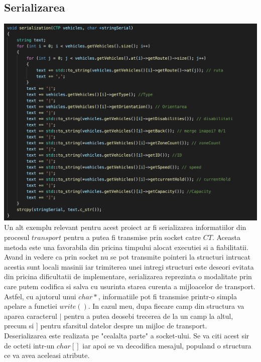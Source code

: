 \documentclass{llncs}
\begin{document}
\subsection{Serializarea}
\includegraphics[scale=0.55]{serializare}
\hspace*{4mm} Un alt exemplu relevant pentru acest proiect ar fi serializarea informatiilor din procesul $transport$ pentru a putea fi transmise prin socket catre $CT$. Aceasta metoda este una favorabila din pricina timpului alocat executiei si a fiabilitatii. Avand in vedere ca prin socket nu se pot transmite pointeri la structuri intrucat acestia sunt locali masinii iar trimiterea unei intregi structuri este deseori evitata din pricina dificultatii de implementare, serializarea reprezinta o modalitate prin care putem codifica si salva cu usurinta starea curenta a mijloacelor de transport. Astfel, cu ajutorul unui $char*$, informatiile pot fi transmise printr-o simpla apelare a functiei $write()$. In cazul meu, dupa fiecare camp din structura va aparea caracterul $\vert$ pentru a putea deosebi trecerea de la un camp la altul, precum si ] pentru sfarsitul datelor despre un mijloc de transport.\\
\hspace*{4mm} Deserializarea este realizata pe "cealalta parte" a socket-ului. Se va citi acest sir de octeti intr-un $char[]$ iar apoi se va decodifica mesajul, populand o structura ce va avea aceleasi atribute.

\vspace{10mm}
\end{document}
